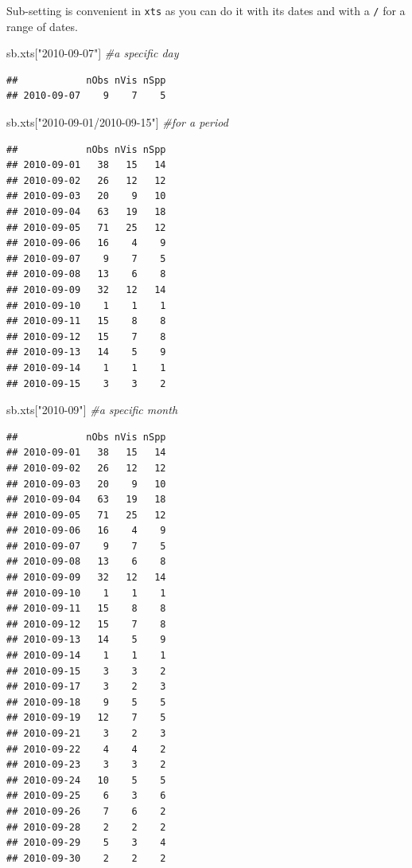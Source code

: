 \documentclass[
  10pt,
]{article}
\newenvironment{Shaded}{\begin{snugshade}}{\end{snugshade}}
\newcommand{\CommentTok}[1]{\textcolor[rgb]{0.56,0.35,0.01}{\textit{#1}}}
\newcommand{\NormalTok}[1]{#1}
\newcommand{\StringTok}[1]{\textcolor[rgb]{0.31,0.60,0.02}{#1}}
\begin{document}
Sub-setting is convenient in \texttt{xts} as you can do it with its dates and with a \texttt{/}
for a range of dates.

\begin{Shaded}
\begin{Highlighting}[]
\NormalTok{sb.xts[}\StringTok{"2010{-}09{-}07"}\NormalTok{] }\CommentTok{\#a specific day}
\end{Highlighting}
\end{Shaded}

\begin{verbatim}
##            nObs nVis nSpp
## 2010-09-07    9    7    5
\end{verbatim}

\begin{Shaded}
\begin{Highlighting}[]
\NormalTok{sb.xts[}\StringTok{"2010{-}09{-}01/2010{-}09{-}15"}\NormalTok{] }\CommentTok{\#for a period}
\end{Highlighting}
\end{Shaded}

\begin{verbatim}
##            nObs nVis nSpp
## 2010-09-01   38   15   14
## 2010-09-02   26   12   12
## 2010-09-03   20    9   10
## 2010-09-04   63   19   18
## 2010-09-05   71   25   12
## 2010-09-06   16    4    9
## 2010-09-07    9    7    5
## 2010-09-08   13    6    8
## 2010-09-09   32   12   14
## 2010-09-10    1    1    1
## 2010-09-11   15    8    8
## 2010-09-12   15    7    8
## 2010-09-13   14    5    9
## 2010-09-14    1    1    1
## 2010-09-15    3    3    2
\end{verbatim}

\begin{Shaded}
\begin{Highlighting}[]
\NormalTok{sb.xts[}\StringTok{"2010{-}09"}\NormalTok{] }\CommentTok{\#a specific month}
\end{Highlighting}
\end{Shaded}

\begin{verbatim}
##            nObs nVis nSpp
## 2010-09-01   38   15   14
## 2010-09-02   26   12   12
## 2010-09-03   20    9   10
## 2010-09-04   63   19   18
## 2010-09-05   71   25   12
## 2010-09-06   16    4    9
## 2010-09-07    9    7    5
## 2010-09-08   13    6    8
## 2010-09-09   32   12   14
## 2010-09-10    1    1    1
## 2010-09-11   15    8    8
## 2010-09-12   15    7    8
## 2010-09-13   14    5    9
## 2010-09-14    1    1    1
## 2010-09-15    3    3    2
## 2010-09-17    3    2    3
## 2010-09-18    9    5    5
## 2010-09-19   12    7    5
## 2010-09-21    3    2    3
## 2010-09-22    4    4    2
## 2010-09-23    3    3    2
## 2010-09-24   10    5    5
## 2010-09-25    6    3    6
## 2010-09-26    7    6    2
## 2010-09-28    2    2    2
## 2010-09-29    5    3    4
## 2010-09-30    2    2    2
\end{verbatim}
\end{document}
